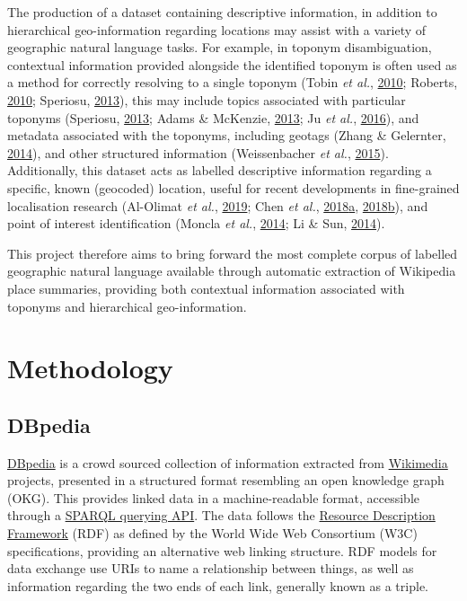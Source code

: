 \documentclass[10pt,]{article}
\begin{document}
The production of a dataset containing descriptive information, in
addition to hierarchical geo-information regarding locations may assist
with a variety of geographic natural language tasks. For example, in
toponym disambiguation, contextual information provided alongside the
identified toponym is often used as a method for correctly resolving to
a single toponym (Tobin \emph{et al.},
\protect\hyperlink{ref-tobin2010}{2010}; Roberts,
\protect\hyperlink{ref-roberts2010}{2010}; Speriosu,
\protect\hyperlink{ref-speriosu2013}{2013}), this may include topics
associated with particular toponyms (Speriosu,
\protect\hyperlink{ref-speriosu2013}{2013}; Adams \& McKenzie,
\protect\hyperlink{ref-adams2013}{2013}; Ju \emph{et al.},
\protect\hyperlink{ref-ju2016}{2016}), and metadata associated with the
toponyms, including geotags (Zhang \& Gelernter,
\protect\hyperlink{ref-zhang2014}{2014}), and other structured
information (Weissenbacher \emph{et al.},
\protect\hyperlink{ref-weissenbacher2015}{2015}). Additionally, this
dataset acts as labelled descriptive information regarding a specific,
known (geocoded) location, useful for recent developments in
fine-grained localisation research (Al-Olimat \emph{et al.},
\protect\hyperlink{ref-al-olimat2019}{2019}; Chen \emph{et al.},
\protect\hyperlink{ref-chen2018a}{2018}\protect\hyperlink{ref-chen2018a}{a},
\protect\hyperlink{ref-chen2018}{2018}\protect\hyperlink{ref-chen2018}{b}),
and point of interest identification (Moncla \emph{et al.},
\protect\hyperlink{ref-moncla2014}{2014}; Li \& Sun,
\protect\hyperlink{ref-li2014}{2014}).

This project therefore aims to bring forward the most complete corpus of
labelled geographic natural language available through automatic
extraction of Wikipedia place summaries, providing both contextual
information associated with toponyms and hierarchical geo-information.

\hypertarget{methodology}{%
\section{Methodology}\label{methodology}}

\hypertarget{dbpedia}{%
\subsection{DBpedia}\label{dbpedia}}

\href{https://wiki.dbpedia.org/}{DBpedia} is a crowd sourced collection
of information extracted from
\href{https://commons.wikimedia.org/wiki/Main_Page}{Wikimedia} projects,
presented in a structured format resembling an open knowledge graph
(OKG). This provides linked data in a machine-readable format,
accessible through a \href{http://www.dbpedia.org/sparql}{SPARQL
querying API}. The data follows the
\href{https://www.w3.org/RDF/}{Resource Description Framework} (RDF) as
defined by the World Wide Web Consortium (W3C) specifications, providing
an alternative web linking structure. RDF models for data exchange use
URIs to name a relationship between things, as well as information
regarding the two ends of each link, generally known as a triple.
\end{document}
